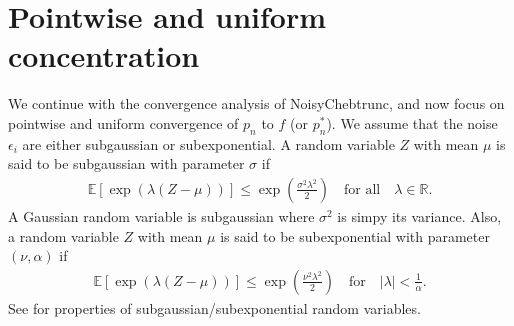 \documentclass[final,onefignum,onetabnum]{siamart220329}
\def\mainalg{NoisyChebtrunc}
\begin{document}
\section{Pointwise and uniform concentration}\label{sec:inf}
We continue with the convergence analysis of \mainalg, and now focus on pointwise and uniform convergence of $p_n$ to $f$ (or $p_n^*$). 
We assume that the noise ${\epsilon_i}$ are {either} subgaussian or subexponential. A random variable $Z$ with mean $\mu$ is said to be subgaussian with parameter $\sigma$ if
\begin{align} \label{subgaussian}
	\mathbb{E} [\exp (\lambda (Z - \mu))] \leq \exp \left( \frac{\sigma^2 \lambda^2}{2} \right)
	\quad \mbox{for all}\quad \lambda \in \mathbb{R}.
\end{align}
{A Gaussian random variable is subgaussian where $\sigma^2$ is simpy its variance.}
Also, a random variable $Z$ with mean $\mu$ is said to be subexponential with parameter $(\nu,\alpha)$ if
\begin{align} \label{subexponential}
	\mathbb{E} [\exp (\lambda (Z - \mu))] \leq \exp \left( \frac{\nu^2 \lambda^2}{2} \right)
	\quad\mbox{for}\quad |\lambda| < \frac{1}{\alpha}.
\end{align}
See \cite{wainwright2019high} for properties of subgaussian/subexponential random variables.
\end{document}
